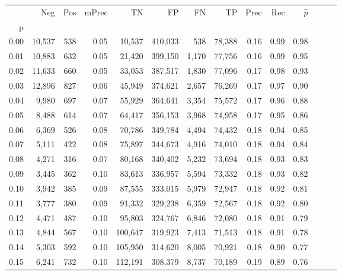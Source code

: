 \begin{tabular}{rrrrrrrrrrrrrr}
\toprule
{} &     Neg &    Pos & mPrec &       TN &       FP &      FN &      TP &  Prec &   Rec & $\hat{p}$ \\
p    &         &        &       &          &          &         &         &       &       &           \\
\midrule
0.00 &  10,537 &    538 &  0.05 &   10,537 &  410,033 &     538 &  78,388 &  0.16 &  0.99 &      0.98 \\
0.01 &  10,883 &    632 &  0.05 &   21,420 &  399,150 &   1,170 &  77,756 &  0.16 &  0.99 &      0.95 \\
0.02 &  11,633 &    660 &  0.05 &   33,053 &  387,517 &   1,830 &  77,096 &  0.17 &  0.98 &      0.93 \\
0.03 &  12,896 &    827 &  0.06 &   45,949 &  374,621 &   2,657 &  76,269 &  0.17 &  0.97 &      0.90 \\
0.04 &   9,980 &    697 &  0.07 &   55,929 &  364,641 &   3,354 &  75,572 &  0.17 &  0.96 &      0.88 \\
0.05 &   8,488 &    614 &  0.07 &   64,417 &  356,153 &   3,968 &  74,958 &  0.17 &  0.95 &      0.86 \\
0.06 &   6,369 &    526 &  0.08 &   70,786 &  349,784 &   4,494 &  74,432 &  0.18 &  0.94 &      0.85 \\
0.07 &   5,111 &    422 &  0.08 &   75,897 &  344,673 &   4,916 &  74,010 &  0.18 &  0.94 &      0.84 \\
0.08 &   4,271 &    316 &  0.07 &   80,168 &  340,402 &   5,232 &  73,694 &  0.18 &  0.93 &      0.83 \\
0.09 &   3,445 &    362 &  0.10 &   83,613 &  336,957 &   5,594 &  73,332 &  0.18 &  0.93 &      0.82 \\
0.10 &   3,942 &    385 &  0.09 &   87,555 &  333,015 &   5,979 &  72,947 &  0.18 &  0.92 &      0.81 \\
0.11 &   3,777 &    380 &  0.09 &   91,332 &  329,238 &   6,359 &  72,567 &  0.18 &  0.92 &      0.80 \\
0.12 &   4,471 &    487 &  0.10 &   95,803 &  324,767 &   6,846 &  72,080 &  0.18 &  0.91 &      0.79 \\
0.13 &   4,844 &    567 &  0.10 &  100,647 &  319,923 &   7,413 &  71,513 &  0.18 &  0.91 &      0.78 \\
0.14 &   5,303 &    592 &  0.10 &  105,950 &  314,620 &   8,005 &  70,921 &  0.18 &  0.90 &      0.77 \\
0.15 &   6,241 &    732 &  0.10 &  112,191 &  308,379 &   8,737 &  70,189 &  0.19 &  0.89 &      0.76 \\

\end{tabular}

